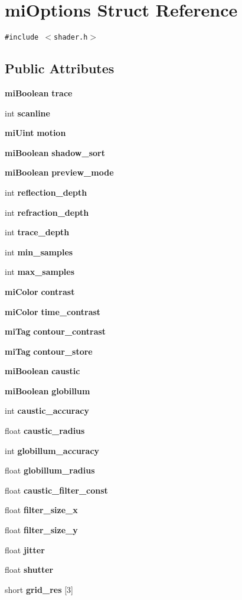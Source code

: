 \section{mi\-Options Struct Reference}
\label{structmiOptions}
{\tt \#include $<$shader.h$>$}

\subsection*{Public Attributes}
\begin{CompactItemize}
\item 
{\bf mi\-Boolean} {\bf trace}
\item 
int {\bf scanline}
\item 
{\bf mi\-Uint} {\bf motion}
\item 
{\bf mi\-Boolean} {\bf shadow\_\-sort}
\item 
{\bf mi\-Boolean} {\bf preview\_\-mode}
\item 
int {\bf reflection\_\-depth}
\item 
int {\bf refraction\_\-depth}
\item 
int {\bf trace\_\-depth}
\item 
int {\bf min\_\-samples}
\item 
int {\bf max\_\-samples}
\item 
{\bf mi\-Color} {\bf contrast}
\item 
{\bf mi\-Color} {\bf time\_\-contrast}
\item 
{\bf mi\-Tag} {\bf contour\_\-contrast}
\item 
{\bf mi\-Tag} {\bf contour\_\-store}
\item 
{\bf mi\-Boolean} {\bf caustic}
\item 
{\bf mi\-Boolean} {\bf globillum}
\item 
int {\bf caustic\_\-accuracy}
\item 
float {\bf caustic\_\-radius}
\item 
int {\bf globillum\_\-accuracy}
\item 
float {\bf globillum\_\-radius}
\item 
float {\bf caustic\_\-filter\_\-const}
\item 
float {\bf filter\_\-size\_\-x}
\item 
float {\bf filter\_\-size\_\-y}
\item 
float {\bf jitter}
\item 
float {\bf shutter}
\item 
short {\bf grid\_\-res} [3]
\item 

\end{CompactItemize}
